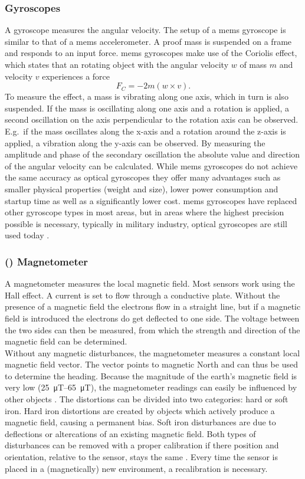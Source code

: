 \subsubsection{ Gyroscopes}
A gyroscope measures the angular velocity.
The setup of a \gls{mems} gyroscope is similar to that of a \gls{mems} accelerometer.
A proof mass is suspended on a frame and responds to an input force.
\gls{mems} gyroscopes make use of the Coriolis effect, which states that an rotating object with the angular velocity $w$ of mass $m$ and velocity $v$ experiences a force
\begin{equation}
	F_C = -2m(w\times v).
\end{equation}
To measure the effect, a mass is vibrating along one axis, which in turn is also suspended.
If the mass is oscillating along one axis and a rotation is applied, a second oscillation on the axis perpendicular to the rotation axis can be observed.
E.g.\ if the mass oscillates along the x-axis and a rotation around the z-axis is applied, a vibration along the y-axis can be observed.
By measuring the amplitude and phase of the secondary oscillation the absolute value and direction of the angular velocity can be calculated.
While \gls{mems} gyroscopes do not achieve the same accuracy as optical gyroscopes they offer many advantages such as smaller physical properties (weight and size), lower power consumption and startup time as well as a significantly lower cost.
\gls{mems} gyroscopes have replaced other gyroscope types in most areas, but in areas where the highest precision possible is necessary, typically in military industry, optical gyroscopes are still used today \cite{Perlmutter2016}.

\subsubsection{() Magnetometer}
A magnetometer measures the local magnetic field.
Most sensors work using the Hall effect.
A current is set to flow through a conductive plate.
Without the presence of a magnetic field the electrons flow in a straight line, but if a magnetic field is introduced the electrons do get deflected to one side.
The voltage between the two sides can then be measured, from which the strength and direction of the magnetic field can be determined.\\
Without any magnetic disturbances, the magnetometer measures a constant local magnetic field vector.
The vector points to magnetic North and can thus be used to determine the heading.
Because the magnitude of the earth's magnetic field is very low (\SIrange{25}{65}{\micro\tesla}), the magnetometer readings can easily be influenced by other objects \cite{Kok2016}.
The distortions can be divided into two categories: hard or soft iron.
Hard iron distortions are created by objects which actively produce a magnetic field, causing a permanent bias.
Soft iron disturbances are due to deflections or altercations of an existing magnetic field.
Both types of disturbances can be removed with a proper calibration if there position and orientation, relative to the sensor, stays the same \cite{Guo2008}.
Every time the sensor is placed in a (magnetically) new environment, a recalibration is necessary.

